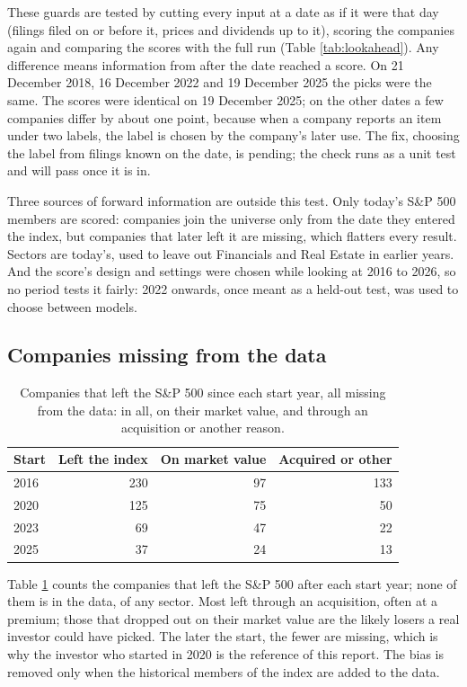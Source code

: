 \documentclass[11pt,a4paper]{article}
\begin{document}
These guards are tested by cutting every input at a date as if it were that day (filings filed on or before it, prices and dividends up to it), scoring the companies again and comparing the scores with the full run (Table \ref{tab:lookahead}). Any difference means information from after the date reached a score. On 21 December 2018, 16 December 2022 and 19 December 2025 the picks were the same. The scores were identical on 19 December 2025; on the other dates a few companies differ by about one point, because when a company reports an item under two labels, the label is chosen by the company's later use. The fix, choosing the label from filings known on the date, is pending; the check runs as a unit test and will pass once it is in.

Three sources of forward information are outside this test. Only today's S\&P 500 members are scored: companies join the universe only from the date they entered the index, but companies that later left it are missing, which flatters every result. Sectors are today's, used to leave out Financials and Real Estate in earlier years. And the score's design and settings were chosen while looking at 2016 to 2026, so no period tests it fairly: 2022 onwards, once meant as a held-out test, was used to choose between models.

\subsection{Companies missing from the data}
\begin{table}[H]
\centering
\small
\caption{Companies that left the S\&P 500 since each start year, all missing from the data: in all, on their market value, and through an acquisition or another reason.}\label{tab:survivors}
\begin{tabular}{l r r r}
\hline
Start & Left the index & On market value & Acquired or other \\
\hline
2016 & 230 & 97 & 133 \\
2020 & 125 & 75 & 50 \\
2023 & 69 & 47 & 22 \\
2025 & 37 & 24 & 13 \\
\hline
\end{tabular}
\end{table}
Table \ref{tab:survivors} counts the companies that left the S\&P 500 after each start year; none of them is in the data, of any sector. Most left through an acquisition, often at a premium; those that dropped out on their market value are the likely losers a real investor could have picked. The later the start, the fewer are missing, which is why the investor who started in 2020 is the reference of this report. The bias is removed only when the historical members of the index are added to the data.
\end{document}
